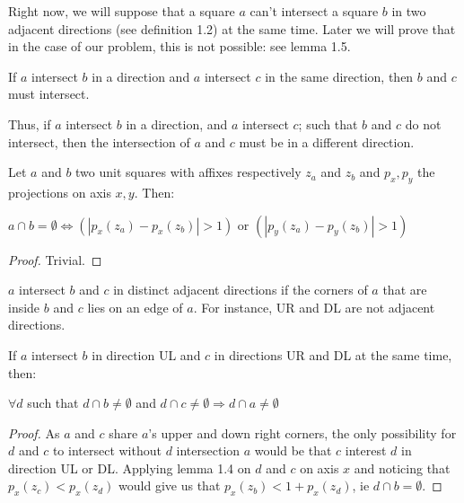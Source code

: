 \documentclass[12pt]{article}
\begin{document}
\begin{remark}
    Right now, we will suppose that a square $a$ can't intersect a square $b$ in two adjacent directions (see definition 1.2) at the same time. 
    Later we will prove that in the case of our problem, this is not possible: see lemma 1.5.
\end{remark}

\begin{lemma}
    If $a$ intersect $b$ in a direction and $a$ intersect $c$ in the same direction, then $b$ and $c$ must intersect. 
\end{lemma}

\begin{remark}
    Thus, if $a$ intersect $b$ in a direction, and $a$ intersect $c$; such that $b$ and $c$ do not intersect, then the intersection of $a$ and $c$ must be in a different direction.
\end{remark}

\begin{lemma}
    Let $a$ and $b$ two unit squares with affixes respectively $z_a$ and $z_b$ and $p_x, p_y$ the projections on axis $x, y$. Then:
    \begin{center}
        $a \cap b = \emptyset \Leftrightarrow (|p_x(z_a) - p_x(z_b)| > 1)$ or $(|p_y(z_a) - p_y(z_b)| >1)$

    \end{center}
\end{lemma}


\begin{proof}
    Trivial.
\end{proof}

\begin{definition}
    $a$ intersect $b$ and $c$ in distinct adjacent directions if the corners of $a$ that are inside $b$ and $c$ lies on an edge of $a$. 
    For instance, UR and DL are not adjacent directions.    
\end{definition}

\begin{lemma}
    If $a$ intersect $b$ in direction UL and $c$ in directions UR and DL at the same time, then:
    \begin{center}
        $\forall d$ such that $d \cap b \ne \emptyset$ and $d \cap c \ne \emptyset \Rightarrow d \cap a \ne \emptyset$
    \end{center} 
\end{lemma}

\begin{proof}
    As $a$ and $c$ share $a$'s upper and down right corners, the only possibility for $d$ and $c$ to intersect without $d$ intersection $a$
    would be that $c$ interest $d$ in direction UL or DL. Applying lemma 1.4 on $d$ and $c$ on axis $x$ and noticing that $p_x(z_c) < p_x(z_d)$ would give us
    that $p_x(z_b) < 1 + p_x(z_d)$, ie $d \cap b = \emptyset$.
\end{proof}
\end{document}
